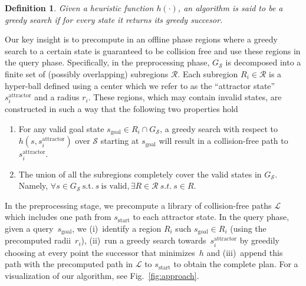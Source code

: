 \documentclass[letterpaper]{article} %
\newcommand{\calL}{\ensuremath{\mathcal{L}}\xspace}
\newcommand{\calS}{\ensuremath{\mathcal{S}}\xspace}
\newcommand{\calR}{\ensuremath{\mathcal{R}}\xspace}
\newcommand{\sAttract}{\ensuremath{s^{\text{attractor}}_i}\xspace}
\newcommand{\sStart}{\ensuremath{s_{\text{start}}\xspace}}
\newcommand{\sGoal}{\ensuremath{s_{\text{goal}}\xspace}}
\newtheorem{definition}{Definition}
\begin{document}
\vspace{2mm}
\begin{definition}
	Given a heuristic function $h(\cdot)$,
	an algorithm is said to be a \emph{greedy search} if for every state it returns its greedy succesor.
\end{definition}

Our key insight is to precompute in an offline phase regions where a greedy search to a certain state is guaranteed to be collision free and use these regions in the query phase.
Specifically, in the preprocessing phase, $G_\calS$ is decomposed into a finite  set of (possibly overlapping) subregions $\calR$.
Each subregion $R_i \in \calR$ is a hyper-ball defined using a center which we refer to as the ``attractor state''~
\sAttract and a radius $r_i$.
These regions, which may contain invalid states, are constructed in such a way that the following two properties hold
\begin{enumerate}[label={\textbf{P\arabic*}}]
  \item \label{property:1} For any valid goal state $s_{\text{goal}} \in R_i \cap G_\calS$, a greedy search with respect to $h(s, \sAttract)$ over $\calS$ starting at $\sGoal$ will result in a collision-free path to \sAttract.
  \item \label{property:2} The union of all the subregions completely cover the valid states in $G_\calS$. 
		  Namely, $\forall s \in G_\calS~\text{s.t.}~s~\text{is valid}, \exists R \in \calR \ s.t. \ s \in R$.
\end{enumerate}

In the preprocessing stage, we precompute a library of collision-free paths $\calL$ which includes one path from $\sStart$ to each attractor state. 
In the query phase, given a query~\sGoal, we 
(i)~identify a region $R_i$ such $\sGoal \in R_i$ (using the precomputed radii~$r_i$),
(ii)~run a greedy search towards~\sAttract by greedily choosing at every point the successor that minimizes~$h$ and
(iii)~append this path with the precomputed path in $\calL$ to $\sStart$ to obtain the complete plan.
For a visualization of our algorithm, see Fig.~\ref{fig:approach}.
\end{document}
